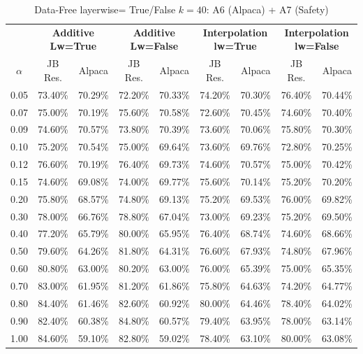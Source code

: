 \begin{table}[h]
\centering
\caption{Data-Free layerwise= True/False $k=40$: A6 (Alpaca) + A7 (Safety)}
\label{tab:res_a6_data_free_40}
\begin{tabular}{c|cc|cc|cc|cc}
\hline
 & \multicolumn{2}{c|}{\textbf{Additive Lw=True}} & \multicolumn{2}{c|}{\textbf{Additive Lw=False}} & \multicolumn{2}{c|}{\textbf{Interpolation lw=True}}& \multicolumn{2}{c}{\textbf{Interpolation lw=False}} \\
$\alpha$ & JB Res. & Alpaca & JB Res. & Alpaca & JB Res. & Alpaca & JB Res. & Alpaca \\
\hline
0.05 & 73.40\% & 70.29\% & 72.20\% & 70.33\% & 74.20\% & 70.30\% & 76.40\% & 70.44\% \\
0.07 & 75.00\% & 70.19\% & 75.60\% & 70.58\% & 72.60\% & 70.45\% & 74.60\% & 70.40\% \\
0.09 & 74.60\% & 70.57\% & 73.80\% & 70.39\% & 73.60\% & 70.06\% & 75.80\% & 70.30\% \\
0.10 & 75.20\% & 70.54\% & 75.00\% & 69.64\% & 73.60\% & 69.76\% & 72.80\% & 70.25\% \\
0.12 & 76.60\% & 70.19\% & 76.40\% & 69.73\% & 74.60\% & 70.57\% & 75.00\% & 70.42\% \\
0.15 & 74.60\% & 69.08\% & 74.00\% & 69.77\% & 75.60\% & 70.14\% & 75.20\% & 70.20\% \\
0.20 & 75.80\% & 68.57\% & 74.80\% & 69.13\% & 75.20\% & 69.53\% & 76.00\% & 69.82\% \\
0.30 & 78.00\% & 66.76\% & 78.80\% & 67.04\% & 73.00\% & 69.23\% & 75.20\% & 69.50\% \\
0.40 & 77.20\% & 65.79\% & 80.00\% & 65.95\% & 76.40\% & 68.74\% & 74.60\% & 68.66\% \\
0.50 & 79.60\% & 64.26\% & 81.80\% & 64.31\% & 76.60\% & 67.93\% & 74.80\% & 67.96\% \\
0.60 & 80.80\% & 63.00\% & 80.20\% & 63.00\% & 76.00\% & 65.39\% & 75.00\% & 65.35\% \\
0.70 & 83.00\% & 61.95\% & 81.20\% & 61.86\% & 75.80\% & 64.63\% & 74.20\% & 64.77\% \\
0.80 & 84.40\% & 61.46\% & 82.60\% & 60.92\% & 80.00\% & 64.46\% & 78.40\% & 64.02\% \\
0.90 & 82.40\% & 60.38\% & 84.80\% & 60.57\% & 79.40\% & 63.95\% & 78.00\% & 63.14\% \\
1.00 & 84.60\% & 59.10\% & 82.80\% & 59.02\% & 78.40\% & 63.10\% & 80.00\% & 63.08\% \\
\hline
\end{tabular}
\end{table}
\FloatBarrier

